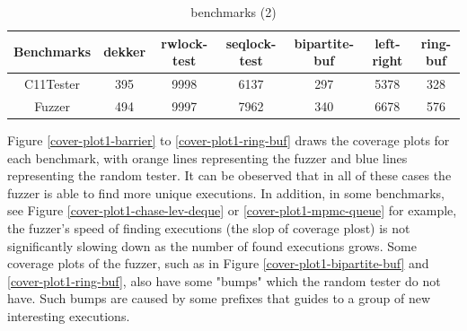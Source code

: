 \begin{table}[h!]
    \begin{tabular}{ |c|cccccc| } 
     \hline
     Benchmarks & dekker & rwlock-test  & seqlock-test &bipartite-buf &  left-right  &   ring-buf \\ 
     \hline
     C11Tester &  395      &     9998     &     6137     &     297      &     5378     &     328   \\ 
     Fuzzer & 494      &     9997     &     7962     &     340      &     6678     &     576    \\ 
     \hline
    \end{tabular}
    \caption{benchmarks (2)}
    \label{c11fuzzer-bench2}
\end{table}

Figure \ref{cover-plot1-barrier} to \ref{cover-plot1-ring-buf} draws the coverage plots for each benchmark, with orange lines representing the fuzzer and blue lines representing the random tester. It can be obeserved that in all of these cases the fuzzer is able to find more unique executions. In addition, in some benchmarks, see Figure \ref{cover-plot1-chase-lev-deque} or \ref{cover-plot1-mpmc-queue} for example, the fuzzer's speed of finding executions (the slop of coverage plost) is not significantly slowing down as the number of found executions grows. Some coverage plots of the fuzzer, such as in Figure \ref{cover-plot1-bipartite-buf} and \ref{cover-plot1-ring-buf}, also have some "bumps" which the random tester do not have. Such bumps are caused by some prefixes that guides to a group of new interesting executions. 

